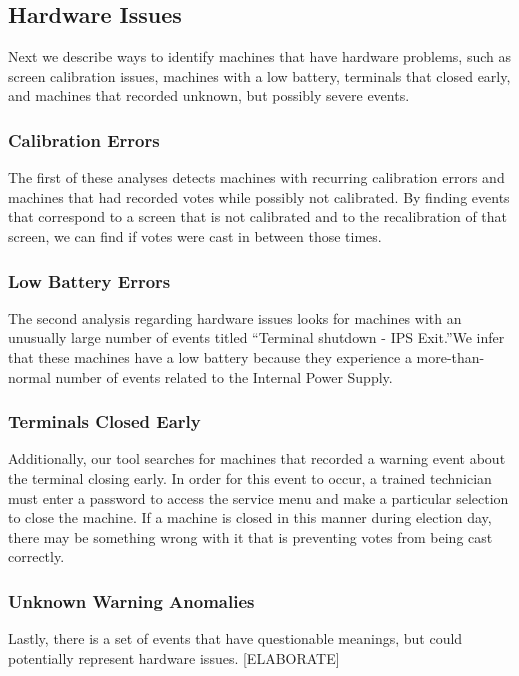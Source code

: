 \subsection{Hardware Issues}
Next we describe ways to identify machines that have hardware problems, such as screen calibration issues, machines with a low battery, terminals that closed early, and machines that recorded unknown, but possibly severe events.  

\subsubsection{Calibration Errors}
The first of these analyses detects machines with recurring calibration errors and machines that had recorded votes while possibly not calibrated.  By finding events that correspond to a screen that is not calibrated and to the recalibration of that screen, we can find if votes were cast in between those times.

\subsubsection{Low Battery Errors}
The second analysis regarding hardware issues looks for machines with an unusually large number of events titled \textquotedblleft Terminal shutdown - IPS Exit.\textquotedblright  We infer that these machines have a low battery because they experience a more-than-normal number of events related to the Internal Power Supply.  

\subsubsection{Terminals Closed Early}
Additionally, our tool searches for machines that recorded a warning event about the terminal closing early.  In order for this event to occur, a trained technician must enter a password to access the service menu and make a particular selection to close the machine.  If a machine is closed in this manner during election day, there may be something wrong with it that is preventing votes from being cast correctly.  

\subsubsection{Unknown Warning Anomalies}
Lastly, there is a set of events that have questionable meanings, but could potentially represent hardware issues.  [ELABORATE]

